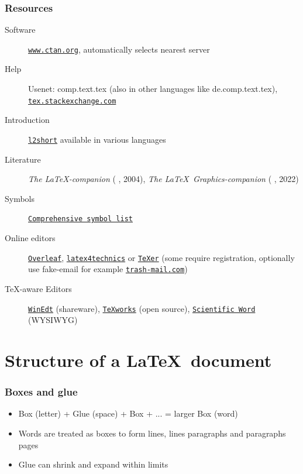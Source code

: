 \documentclass[presentation,hideothersubsections,final,10pt,american]{beamer}
\begin{document}
\begin{frame}
  \frametitle{Resources}
  \begin{description}
    \item[Software]{\href{www.ctan.org}{\texttt{www.ctan.org}}, automatically selects nearest server }
    \item[Help]{Usenet: comp.text.tex (also in other languages like de.comp.text.tex), \href{https://tex.stackexchange.com/}{\texttt{tex.stackexchange.com}}}
    \item[Introduction]{\href{https://ctan.org/pkg/lshort}{\texttt{l2short}} available in various languages}
    \item[Literature]{\textit{The \LaTeX -companion} ( , 2004), \textit{The \LaTeX\ Graphics-companion} ( , 2022)}
    \item[Symbols]{\href{https://ctan.org/pkg/comprehensive}{\texttt{Comprehensive symbol list}} }
    \item[Online editors]{\href{https://www.overleaf.com}{\texttt{Overleaf}}, \href{https://www.latex4technics.com/}{\texttt{latex4technics}} or \href{https://artofproblemsolving.com/texer}{\texttt{TeXer}} (some require registration, optionally use fake-email for example \href{https://www.trash-mail.com/}{\texttt{trash-mail.com}})}
    \item[\TeX-aware Editors]{\href{https://www.winedt.com/}{\texttt{WinEdt}} (shareware), \href{https://www.tug.org/texworks/}{\texttt{TeXworks}} (open source), \href{https://github.com/ScientificWord/sciword}{\texttt{Scientific Word}} (WYSIWYG) }
  \end{description}
\end{frame}

\section{Structure of a \LaTeX\ document}

\begin{frame}
  \frametitle{Boxes and glue}
  \begin{itemize}
    \item{Box (letter) + Glue (space) + Box + ... = larger
        Box (word)}
    \item{Words are treated as boxes to form lines, lines
        paragraphs and paragraphs pages}
    \item{Glue can shrink and expand within limits}
  \end{itemize}
\end{frame}
\end{document}
